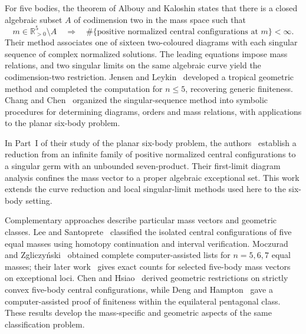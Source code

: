 \documentclass[Threeside,11pt]{article}
\theoremstyle{definition}
\theoremstyle{remark}
\numberwithin{equation}{section}
\theoremstyle{remark}
\newcommand{\Rp}{\mathbb{R}_{>0}}
\begin{document}
For five bodies, the theorem of Albouy and Kaloshin states that there is a
closed algebraic subset $A$ of codimension two in the mass space such that
\[
 m\in\Rp^5\setminus A
 \quad\Longrightarrow\quad
 \#\{\text{positive normalized central configurations at }m\}<\infty.
\]
Their method associates one of sixteen two-coloured diagrams with each singular
sequence of complex normalized solutions. The leading equations impose mass
relations, and two singular limits on the same algebraic curve yield the
codimension-two restriction. Jensen and Leykin~\cite{JL} developed a tropical
geometric method and completed the computation for $n\le5$, recovering generic
finiteness. Chang and Chen~\cite{CC1,CC2} organized the singular-sequence method
into symbolic procedures for determining diagrams, orders and mass relations,
with applications to the planar six-body problem.

In Part~I of their study of the planar six-body problem, the
authors~\cite{CT26} establish a reduction from an infinite family of
positive normalized central configurations to a singular germ with an
unbounded seven-product. Their first-limit diagram analysis confines
the mass vector to a proper algebraic exceptional set. This work
extends the curve reduction and local singular-limit methods used
here to the six-body setting.

Complementary approaches describe particular mass vectors and geometric
classes. Lee and Santoprete~\cite{LS} classified the isolated central
configurations of five equal masses using homotopy continuation and interval
verification. Moczurad and Zgliczy\'nski~\cite{MZ19} obtained complete
computer-assisted lists for $n=5,6,7$ equal masses; their later work~\cite{MZ26}
gives exact counts for selected five-body mass vectors on exceptional loci.
Chen and Hsiao~\cite{CH18} derived geometric restrictions on strictly convex
five-body central configurations, while Deng and Hampton~\cite{DH} gave a
computer-assisted proof of finiteness within the equilateral pentagonal class. These results develop the
mass-specific and geometric aspects of the same classification problem.
\end{document}
